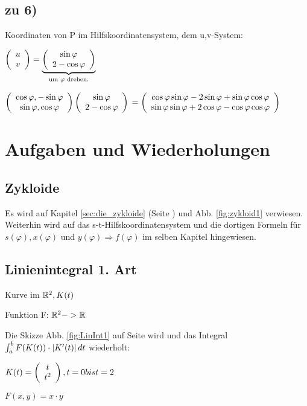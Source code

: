 \subsection{zu 6)}
\renewcommand{\ldate}{2016-01-16}
Koordinaten von P im Hilfskoordinatensystem, dem u,v-System: 

$   \left(  \begin{array}{c} u\\v \end{array}  \right)   = \underbrace{  \left(  \begin{array}{c} \sin \varphi\\2 - \cos \varphi \end{array}  \right)  }_{\textrm{um } \varphi \textrm{ drehen.}} $

$   \left(  \begin{array}{c} \cos \varphi, -\sin \varphi\\\sin \varphi, \cos \varphi \end{array}  \right)     \left(  \begin{array}{c} \sin \varphi\\2-\cos \varphi \end{array}  \right)   $
$=  \left(  \begin{array}{c} \cos \varphi \sin \varphi - 2 \sin \varphi + \sin \varphi \cos \varphi\\\sin \varphi \sin \varphi + 2 \cos \varphi - \cos \varphi \cos \varphi  \end{array}  \right)   $

\section{Aufgaben und Wiederholungen}

\subsection{Zykloide}
Es wird auf Kapitel \ref{sec:die_zykloide} (Seite \pageref{sec:die_zykloide}) und Abb. \ref{fig:zykloid1} verwiesen. Weiterhin wird auf das s-t-Hilfskoordinatensystem und die dortigen Formeln für $ s(\varphi), x(\varphi) $ und $ y(\varphi) \Rightarrow f(\varphi) $ im selben Kapitel hingewiesen. 

\subsection{Linienintegral 1. Art}
Kurve im $\mathbb{R}^2, K(t)$

Funktion F: $\mathbb{R}^2 -> \mathbb{R}$

Die Skizze Abb. \ref{fig:LinInt1} auf Seite \pageref{fig:LinInt1} wird und das Integral $\int_{a}^{b} F(K(t)) \cdot  \left\vert K'(t) \right\vert  dt$ wiederholt:

$ K(t) =   \left(  \begin{array}{c} t\\t^2 \end{array}  \right)  , t=0 bis t = 2 $

$ F(x,y) = x\cdot y $

